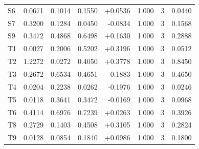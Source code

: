 \begin{table}[!htbp]
\begin{tabular}{lrrrrrrr}
S6 & 0.0671 & 0.1014 & 0.1550 & +0.0536 & 1.000 & 3 & 0.0440 \\
S7 & 0.3200 & 0.1284 & 0.0450 & -0.0834 & 1.000 & 3 & 0.1568 \\
S9 & 0.3472 & 0.4868 & 0.6498 & +0.1630 & 1.000 & 3 & 0.2888 \\
T1 & 0.0027 & 0.2006 & 0.5202 & +0.3196 & 1.000 & 3 & 0.0512 \\
T2 & 1.2272 & 0.0272 & 0.4050 & +0.3778 & 1.000 & 3 & 0.8450 \\
T3 & 0.2672 & 0.6534 & 0.4651 & -0.1883 & 1.000 & 3 & 0.4650 \\
T4 & 0.0204 & 0.2238 & 0.0262 & -0.1976 & 1.000 & 3 & 0.0246 \\
T5 & 0.0118 & 0.3641 & 0.3472 & -0.0169 & 1.000 & 3 & 0.0968 \\
T6 & 0.4114 & 0.6976 & 0.7239 & +0.0263 & 1.000 & 3 & 0.3926 \\
T8 & 0.2729 & 0.1403 & 0.4508 & +0.3105 & 1.000 & 3 & 0.2824 \\
T9 & 0.0128 & 0.0854 & 0.1840 & +0.0986 & 1.000 & 3 & 0.1800 \\
\bottomrule
\end{tabular}
\end{table}


